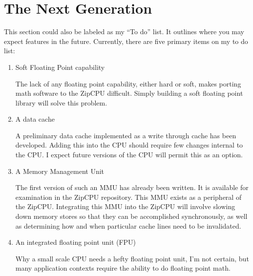 \documentclass{gqtekspec}
\begin{document}
\section{The Next Generation}
This section could also be labeled as my ``To do'' list.  It outlines where
you may expect features in the future.  Currently, there are five primary
items on my to do list:
\begin{enumerate}
\item Soft Floating Point capability

	The lack of any floating point capability, either hard or soft, makes
	porting math software to the ZipCPU difficult.  Simply building a 
	soft floating point library will solve this problem.

\item A data cache

	A preliminary data cache implemented as a write through cache has
	been developed.  Adding this into the CPU should require few changes
	internal to the CPU.  I expect future versions of the CPU will permit
	this as an option.

\item A Memory Management Unit

	The first version of such an MMU has already been written.  It is 
	available for examination in the ZipCPU repository.  This MMU exists
	as a peripheral of the ZipCPU.  Integrating this MMU into the ZipCPU
	will involve slowing down memory stores so that they can be
	accomplished synchronously, as well as determining how and when
	particular cache lines need to be invalidated.

\item An integrated floating point unit (FPU)

	Why a small scale CPU needs a hefty floating point unit, I'm not
	certain, but many application contexts require the ability to do
	floating point math.
\end{enumerate}
\end{document}
